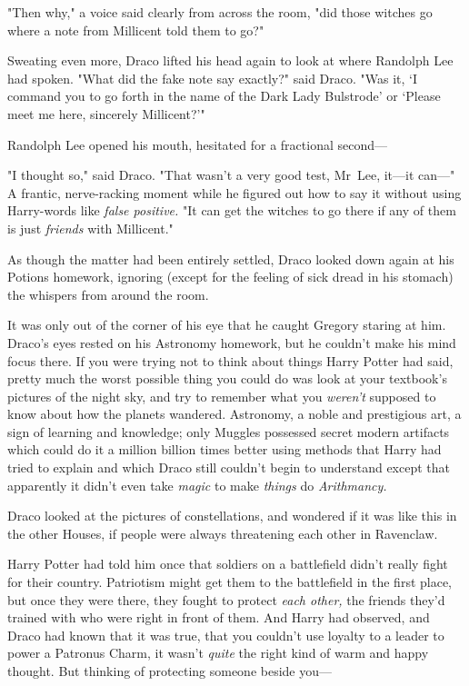 "Then why," a voice said clearly from across the room, "did those witches go
where a note from Millicent told them to go?"

Sweating even more, Draco lifted his head again to look at where Randolph Lee
had spoken. "What did the fake note say exactly?" said Draco. "Was it, `I
command you to go forth in the name of the Dark Lady Bulstrode' or `Please meet
me here, sincerely Millicent?'"

Randolph Lee opened his mouth, hesitated for a fractional second---

"I thought so," said Draco. "That wasn't a very good test, Mr~Lee, it---it
can---" A frantic, nerve-racking moment while he figured out how to say it
without using Harry-words like \emph{false positive.} "It can get the witches
to go there if any of them is just \emph{friends} with Millicent."

As though the matter had been entirely settled, Draco looked down again at his
Potions homework, ignoring (except for the feeling of sick dread in his
stomach) the whispers from around the room.

It was only out of the corner of his eye that he caught Gregory staring at him.
\later
Draco's eyes rested on his Astronomy homework, but he couldn't make his mind
focus there. If you were trying not to think about things Harry Potter had
said, pretty much the worst possible thing you could do was look at your
textbook's pictures of the night sky, and try to remember what you \emph{weren't}
supposed to know about how the planets wandered. Astronomy, a noble
and prestigious art, a sign of learning and knowledge; only Muggles possessed
secret modern artifacts which could do it a million billion times better using
methods that Harry had tried to explain and which Draco still couldn't begin to
understand except that apparently it didn't even take \emph{magic} to make
\emph{things} do \emph{Arithmancy.}

Draco looked at the pictures of constellations, and wondered if it was like
this in the other Houses, if people were always threatening each other in
Ravenclaw.

Harry Potter had told him once that soldiers on a battlefield didn't really
fight for their country. Patriotism might get them to the battlefield in the
first place, but once they were there, they fought to protect \emph{each
other,} the friends they'd trained with who were right in front of them. And
Harry had observed, and Draco had known that it was true, that you couldn't use
loyalty to a leader to power a Patronus Charm, it wasn't \emph{quite} the right
kind of warm and happy thought. But thinking of protecting someone beside you---

